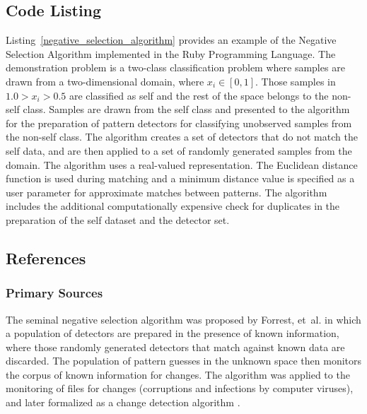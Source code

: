 \subsection{Code Listing}
Listing~\ref{negative_selection_algorithm} provides an example of the Negative Selection Algorithm implemented in the Ruby Programming Language.
The demonstration problem is a two-class classification problem where samples are drawn from a two-dimensional domain, where $x_i \in [0,1]$. Those samples in $1.0>x_i>0.5$ are classified as self and the rest of the space belongs to the non-self class. Samples are drawn from the self class and presented to the algorithm for the preparation of pattern detectors for classifying unobserved samples from the non-self class.
The algorithm creates a set of detectors that do not match the self data, and are then applied to a set of randomly generated samples from the domain. The algorithm uses a real-valued representation. The Euclidean distance function is used during matching and a minimum distance value is specified as a user parameter for approximate matches between patterns. The algorithm includes the additional computationally expensive check for duplicates in the preparation of the self dataset and the detector set.



\subsection{References}

% 
% 
\subsubsection{Primary Sources}
The seminal negative selection algorithm was proposed by Forrest, et~al. \cite{Forrest1994} in which a population of detectors are prepared in the presence of known information, where those randomly generated detectors that match against known data are discarded. The population of pattern guesses in the unknown space then monitors the corpus of known information for changes. The algorithm was applied to the monitoring of files for changes (corruptions and infections by computer viruses), and later formalized as a change detection algorithm \cite{D'haeseleer1996a, D'haeseleer1996}.

